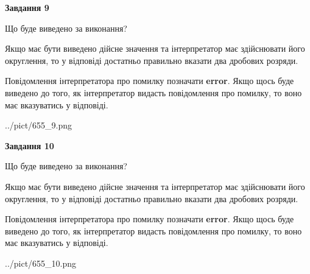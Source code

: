 \documentclass[12pt, ukrainian]{article}
\begin{document}
{\begin {Large}
{\begin {center}\textbf{Завдання 9}\end {center}}\par
Що буде виведено за виконання? \par

Якщо має бути виведено дійсне значення та інтерпретатор має здійснювати його округлення, 
то у відповіді достатньо правильно вказати два дробових розряди.

Повідомлення інтерпретатора про помилку позначати \textbf{error}.
Якщо щось буде виведено до того, як інтерпретатор видасть повідомлення про помилку, 
то воно має вказуватись у відповіді. \par

\begin{center}
	{../pict/655_9.png}
\end{center}
\newpage

{\begin {center}\textbf{Завдання 10}\end {center}}\par
Що буде виведено за виконання? \par

Якщо має бути виведено дійсне значення та інтерпретатор має здійснювати його округлення, 
то у відповіді достатньо правильно вказати два дробових розряди.

Повідомлення інтерпретатора про помилку позначати \textbf{error}.
Якщо щось буде виведено до того, як інтерпретатор видасть повідомлення про помилку, 
то воно має вказуватись у відповіді. \par

\begin{center}
	{../pict/655_10.png}
\end{center}
\newpage

\end {Large}}
\end{document}
